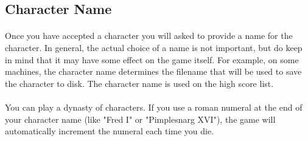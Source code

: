 \subsection{Character Name}
\paragraph{}
Once you have accepted a character you will asked to provide
a name for the character. In general, the actual choice of a name is not
important, but do keep in mind that it may have some effect on the game
itself. For example, on some machines, the character name determines the
filename that will be used to save the character to disk. The character
name is used on the high score list.

\paragraph{}
You can play a dynasty of characters. If you use a roman numeral at the
end of your character name (like "Fred I" or "Pimplesnarg XVI"), the game
will automatically increment the numeral each time you die.


